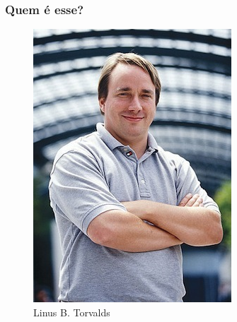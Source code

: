 \documentclass[xcolor=dvipsnames]{beamer}
\begin{document}
\begin{frame}
\begin{figure}
\begin{center}
	\end{center}
	\end{figure}

\end{frame}



\begin{frame}
	\frametitle{Quem é esse?}
	\begin{figure}
	\begin{center}
	\includegraphics[scale=0.6]{lbt.jpg}\\
	\pause
	Linus B. Torvalds
	\end{center}
	\end{figure}
\end{frame}
\end{document}
